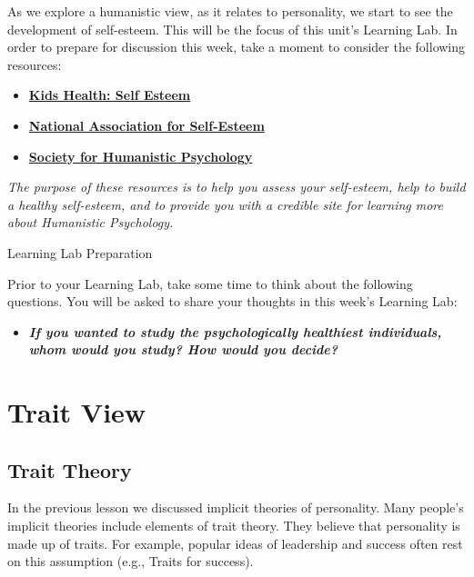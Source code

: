 \documentclass[
]{book}
\providecommand{\tightlist}{%
  \setlength{\itemsep}{0pt}\setlength{\parskip}{0pt}}
\begin{document}
\begin{reflect}
As we explore a humanistic view, as it relates to personality, we start to see the development of self-esteem. This will be the focus of this unit's Learning Lab. In order to prepare for discussion this week, take a moment to consider the following resources:

\begin{itemize}
\tightlist
\item
  \href{https://kidshealth.org/en/kids/self-esteem.html}{\textbf{Kids Health: Self Esteem}}\\
\item
  \href{http://healthyselfesteem.org/}{\textbf{National Association for Self-Esteem}}\\
\item
  \href{https://www.apa.org/about/division/div32}{\textbf{Society for Humanistic Psychology}}
\end{itemize}

\emph{The purpose of these resources is to help you assess your self-esteem, help to build a healthy self-esteem, and to provide you with a credible site for learning more about Humanistic Psychology.}

{Learning Lab Preparation}

Prior to your Learning Lab, take some time to think about the following questions. You will be asked to share your thoughts in this week's Learning Lab:

\begin{itemize}
\tightlist
\item
  \textbf{\emph{If you wanted to study the psychologically healthiest individuals, whom would you study? How would you decide?}}
\end{itemize}
\end{reflect}

\hypertarget{trait-view}{%
\section{Trait View}\label{trait-view}}

\hypertarget{trait-theory}{%
\subsection*{Trait Theory}\label{trait-theory}}

In the previous lesson we discussed implicit theories of personality. Many people's implicit theories include elements of trait theory. They believe that personality is made up of traits. For example, popular ideas of leadership and success often rest on this assumption (e.g., Traits for success).
\end{document}
